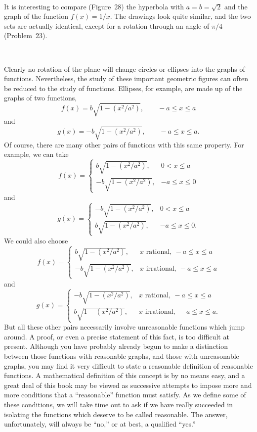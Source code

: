 \begin{center}
\\[0.6em]
\end{center}

It is interesting to compare (Figure~28) the hyperbola with $a=b=\sqrt{2}$ and
the graph of the function $f(x)=1/x$. The drawings look quite similar, and the
two sets are actually identical, except for a rotation through an angle of
$\pi/4$ (Problem~23).

\begin{center}
\\[0.6em]
\end{center}

Clearly no rotation of the plane will change circles or ellipses into the
graphs of functions. Nevertheless, the study of these important geometric
figures can often be reduced to the study of functions. Ellipses, for example,
are made up of the graphs of two functions,
\[
f(x)=b\sqrt{1-(x^2/a^2)},\qquad -a\leq x\leq a
\]
and
\[
g(x)=-b\sqrt{1-(x^2/a^2)},\qquad -a\leq x\leq a.
\]
Of course, there are many other pairs of functions with this same property.
For example, we can take
\[
f(x)=\begin{cases}
b\sqrt{1-(x^2/a^2)}, & 0<x\leq a\\
-b\sqrt{1-(x^2/a^2)}, & -a\leq x\leq 0
\end{cases}
\]
and
\[
g(x)=\begin{cases}
-b\sqrt{1-(x^2/a^2)}, & 0<x\leq a\\
b\sqrt{1-(x^2/a^2)}, & -a\leq x\leq 0.
\end{cases}
\]
We could also choose
\[
f(x)=\begin{cases}
b\sqrt{1-(x^2/a^2)}, & x\text{ rational},\ -a\leq x\leq a\\
-b\sqrt{1-(x^2/a^2)}, & x\text{ irrational},\ -a\leq x\leq a
\end{cases}
\]
and
\[
g(x)=\begin{cases}
-b\sqrt{1-(x^2/a^2)}, & x\text{ rational},\ -a\leq x\leq a\\
b\sqrt{1-(x^2/a^2)}, & x\text{ irrational},\ -a\leq x\leq a.
\end{cases}
\]
But all these other pairs necessarily involve unreasonable functions which jump
around. A proof, or even a precise statement of this fact, is too difficult at
present. Although you have probably already begun to make a distinction between
those functions with reasonable graphs, and those with unreasonable graphs, you
may find it very difficult to state a reasonable definition of reasonable
functions. A mathematical definition of this concept is by no means easy, and a
great deal of this book may be viewed as successive attempts to impose more and
more conditions that a ``reasonable'' function must satisfy. As we define some
of these conditions, we will take time out to ask if we have really succeeded
in isolating the functions which deserve to be called reasonable. The answer,
unfortunately, will always be ``no,'' or at best, a qualified ``yes.''

